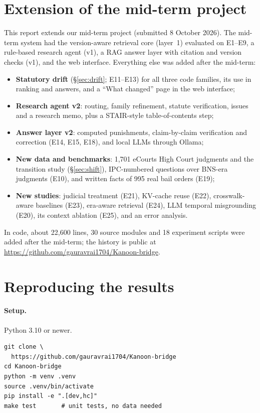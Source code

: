 \documentclass[sigconf,nonacm]{acmart}
\begin{document}
\section{Extension of the mid-term project}\label{app:extension}
This report extends our mid-term project (submitted 8 October 2026). The mid-term system had the
version-aware retrieval core (layer~1) evaluated on E1--E9, a rule-based research agent (v1), a RAG
answer layer with citation and version checks (v1), and the web interface. Everything else was
added after the mid-term:
\begin{itemize}
\item \textbf{Statutory drift} (\S\ref{sec:drift}; E11--E13) for all three code families, its use
in ranking and answers, and a ``What changed'' page in the web interface;
\item \textbf{Research agent v2}: routing, family refinement, statute verification, issues and a
research memo, plus a STAIR-style table-of-contents step;
\item \textbf{Answer layer v2}: computed punishments, claim-by-claim verification and correction
(E14, E15, E18), and local LLMs through Ollama;
\item \textbf{New data and benchmarks}: 1,701 eCourts High Court judgments and the transition study
(\S\ref{sec:shift}), IPC-numbered questions over BNS-era judgments (E10), and written facts of 995
real bail orders (E19);
\item \textbf{New studies}: judicial treatment (E21), KV-cache reuse (E22), crosswalk-aware
baselines (E23), era-aware retrieval (E24), LLM temporal misgrounding (E20), its context ablation
(E25), and an error analysis.
\end{itemize}
In code, about 22{,}600 lines, 30 source modules and 18 experiment scripts were added after the
mid-term; the history is public at \url{https://github.com/gauravrai1704/Kanoon-bridge}.

\section{Reproducing the results}\label{app:reproduce}
\paragraph{Setup.} Python 3.10 or newer.
{\small
\begin{verbatim}
git clone \
  https://github.com/gauravrai1704/Kanoon-bridge
cd Kanoon-bridge
python -m venv .venv
source .venv/bin/activate
pip install -e ".[dev,hc]"
make test       # unit tests, no data needed
\end{verbatim}
}
\end{document}
